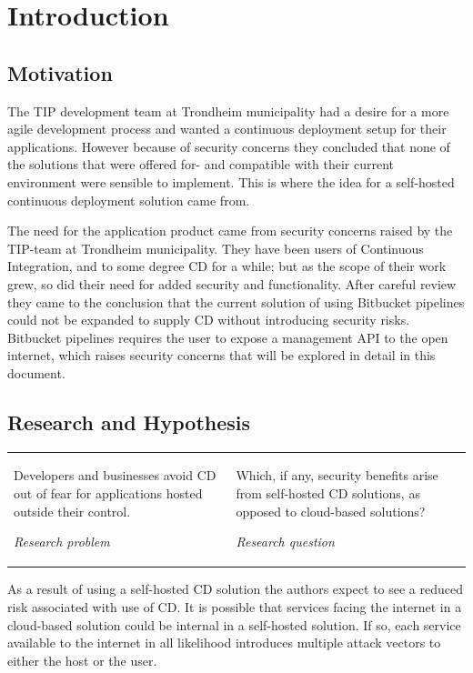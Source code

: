 \chapter{Introduction}
\label{chap:introduction}
\section{Motivation}
The \acrfull{TIP} development team at Trondheim municipality had a desire for a more agile development process and wanted a continuous deployment setup for their applications. However because of security concerns they concluded that none of the solutions that were offered for- and compatible with their current environment were sensible to implement. This is where the idea for a self-hosted continuous deployment solution came from.

The need for the application product came from security concerns raised by the TIP-team at Trondheim municipality. They have been users of Continuous Integration, and to some degree \acrfull{CD} for a while; but as the scope of their work grew, so did their need for added security and functionality. After careful review they came to the conclusion that the current solution of using Bitbucket pipelines could not be expanded to supply \acrshort{CD} without introducing security risks. Bitbucket pipelines requires the user to expose a management \acrshort{API} to the open internet, which raises security concerns that will be explored in detail in this document.

\section{Research and Hypothesis}
\begin{tabularx}{\linewidth}{X X}
    \epigraph{Developers and businesses avoid \acrshort{CD} out of fear for applications hosted outside their control.}{\textit{Research problem}}
    & \epigraph{Which, if any, security benefits arise from self-hosted \acrshort{CD} solutions, as opposed to cloud-based solutions?}{\textit{Research question}}
\end{tabularx}
As a result of using a self-hosted \acrshort{CD} solution the authors expect to see a reduced risk associated with use of \acrshort{CD}. It is possible that services facing the internet in a cloud-based solution could be internal in a self-hosted solution. If so, each service available to the internet in all likelihood introduces multiple attack vectors to either the host or the user.

